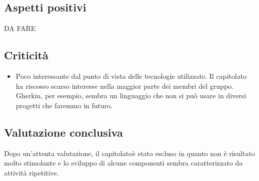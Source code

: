 \subsection{Aspetti positivi}
 DA FARE



\subsection{Criticità}
\begin{itemize}
	\item Poco interessante dal punto di vista delle tecnologie utilizzate. Il capitolato ha riscosso scarso interesse nella maggior parte dei membri del gruppo. Gherkin, per esempio, sembra un linguaggio che non si può usare in diversi progetti che faremmo in futuro. 
\end{itemize}

\subsection{Valutazione conclusiva}
Dopo un'attenta valutazione, il capitolato\glos  è stato escluso in quanto non è risultato molto stimolante e lo sviluppo di alcune componenti sembra caratterizzato da attività ripetitive.
